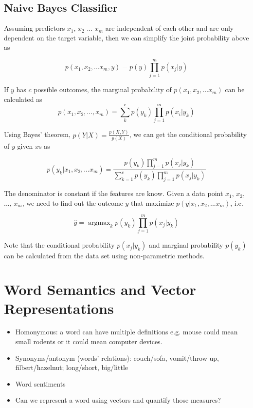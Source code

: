 \documentclass[12pt, oneside]{article}
\DeclareMathOperator*{\argmax}{argmax} %
\begin{document}
\subsection{Naive Bayes Classifier}

Assuming predictors $x_1$, $x_2$ ... $x_m$ are independent of each other and are only dependent on the target variable, then we can simplify the joint probability above as

\begin{equation}
p(x_1, x_2, ...x_m, y)=p(y)\prod\limits_{j=1}^{m}p(x_j|y)
\end{equation}

If $y$ has $c$ possible outcomes, the marginal probability of $p(x_1, x_2, ...x_m)$ can be calculated as 
\begin{equation}
p(x_1, x_2, ...,x_m)=\sum\limits_{k}^{c}p(y_k)\prod\limits_{j=1}^{m}p(x_i|y_k)
\end{equation}

Using Bayes' theorem, $p(Y|X)=\frac{p(X,Y)}{p(X)}$, we can get the conditional probability of $y$ given $x$s as

\begin{equation}
p(y_k|x_1, x_2, ...x_m)=\frac{p(y_k)\prod\limits_{j=1}^{m}p(x_j|y_k)}{\sum\limits_{k=1}^{c}p(y_k)\prod\limits_{j=1}^{m}p(x_j|y_k)}
\end{equation}


The denominator is constant if the features are know. Given a data point $x_1$, $x_2$, ..., $x_m$, we need to find out the outcome $y$ that maximize $p(y|x_1, x_2, ...x_m)$, i.e.

$$
\hat{y}=\argmax_{k}p(y_k)\prod\limits_{j=1}^{m}p(x_j|y_k)
$$

Note that the conditional probability $p(x_j|y_k)$ and marginal probability $p(y_k)$ can be calculated from the data set using non-parametric methods.


\section{Word Semantics and Vector Representations}
\begin{itemize} 
\item Homonymous: a word can have multiple definitions e.g. mouse could mean small rodents or it could mean computer devices. 
\item Synonyms/antonym (words' relations): couch/sofa, vomit/throw up, filbert/hazelnut; long/short, big/little
\item Word sentiments
\item Can we represent a word using vectors and quantify those measures?
\end{itemize}
\end{document}
